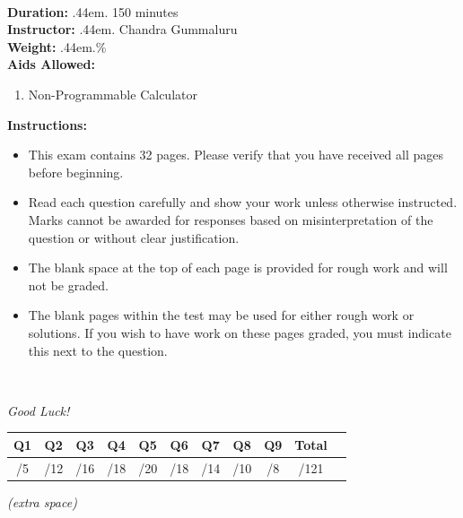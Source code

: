 \documentclass[12pt]{article}
\makeatletter
\newcommand\cdotfill{%
    \leavevmode\cleaders\hb@xt@.44em{\hss$.$\hss}\hfill\kern\z@
}
\makeatother
\begin{document}
\begin{minipage}{0.6\textwidth}
\begin{tabular}{|c|c|c|c|c|c|c|c|c|c|}
  \hspace{1.2em}\; & \hspace{1.2em}\; & \hspace{1.2em}\; & \hspace{1.2em}\; & \hspace{1.2em}\; & \hspace{1.2em}\; & \hspace{1.2em}\; & \hspace{1.2em}\; & \hspace{1.2em}\; & \hspace{1.2em}\;\\
  \hline
\end{tabular}
\end{minipage}
\\[0.75cm]
\noindent \textbf{Duration:}\cdotfill {150 minutes}\\
\textbf{Instructor:}\cdotfill Chandra Gummaluru\\
\textbf{Weight:}\cdotfill 40\% \\
\textbf{Aids Allowed:}
\begin{enumerate}
    \item[(1)] Non-Programmable Calculator
\end{enumerate}
\textbf{Instructions:}
\begin{itemize}
    \item This exam contains 32 pages. Please verify that you have received all pages before beginning.
    \item Read each question carefully and show your work unless otherwise instructed. Marks cannot be awarded for responses based on misinterpretation of the question or without clear justification.
    \item The blank space at the top of each page is provided for rough work and will not be graded.
    \item The blank pages within the test may be used for either rough work or solutions. If you wish to have work on these pages graded, you must indicate this next to the question.
\end{itemize}
\\[0.25cm]
\begin{center}
    \textit{Good Luck!}
\end{center}

\vfill
\begin{center}
\begin{tabular}{|c|c|c|c|c|c|c|c|c|c|c|}
  \hline
  \textbf{Q1} & \textbf{Q2} & \textbf{Q3} & \textbf{Q4} & \textbf{Q5} &
  \textbf{Q6} & \textbf{Q7} & \textbf{Q8} & \textbf{Q9} & \textbf{Total} \\
  \hline
  /5 & /12 & /16 & /18 & /20 & /18 & /14 & /10 & /8 & /121 \\[1.2em]
  \hline
\end{tabular}
\end{center}

\clearpage



\clearpage

\begin{center}
    \textit{(extra space)}
\end{center}
\end{document}
